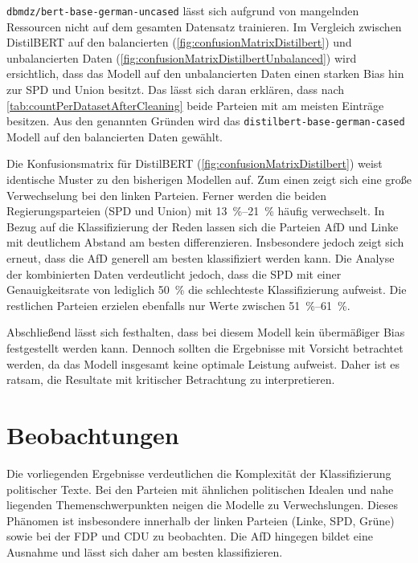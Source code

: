 \texttt{dbmdz/bert-base-german-uncased} lässt sich aufgrund von mangelnden Ressourcen nicht auf dem gesamten Datensatz trainieren. Im Vergleich zwischen DistilBERT auf den balancierten (\autoref{fig:confusionMatrixDistilbert}) und unbalancierten Daten (\autoref{fig:confusionMatrixDistilbertUnbalanced}) wird ersichtlich, dass das Modell auf den unbalancierten Daten einen starken Bias hin zur \ac{SPD} und Union besitzt. Das lässt sich daran erklären, dass nach \autoref{tab:countPerDatasetAfterCleaning} beide Parteien mit am meisten Einträge besitzen. Aus den genannten Gründen wird das \texttt{distilbert-base-german-cased} Modell auf den balancierten Daten gewählt.

Die Konfusionsmatrix für DistilBERT (\autoref{fig:confusionMatrixDistilbert}) weist identische Muster zu den bisherigen Modellen auf. Zum einen zeigt sich eine große Verwechselung bei den linken Parteien. Ferner werden die beiden Regierungsparteien (\ac{SPD} und Union) mit \SIrange{13}{21}{\percent} häufig verwechselt. In Bezug auf die Klassifizierung der Reden lassen sich die Parteien \ac{AfD} und Linke mit deutlichem Abstand am besten differenzieren. Insbesondere jedoch zeigt sich erneut, dass die \ac{AfD} generell am besten klassifiziert werden kann. Die Analyse der kombinierten Daten verdeutlicht jedoch, dass die \ac{SPD} mit einer Genauigkeitsrate von lediglich \SI{50}{\percent} die schlechteste Klassifizierung aufweist. Die restlichen Parteien erzielen ebenfalls nur Werte zwischen \SIrange{51}{61}{\percent}.

Abschließend lässt sich festhalten, dass bei diesem Modell kein übermäßiger Bias festgestellt werden kann. Dennoch sollten die Ergebnisse mit Vorsicht betrachtet werden, da das Modell insgesamt keine optimale Leistung aufweist. Daher ist es ratsam, die Resultate mit kritischer Betrachtung zu interpretieren.

\section{Beobachtungen}

Die vorliegenden Ergebnisse verdeutlichen die Komplexität der Klassifizierung politischer Texte. Bei den Parteien mit ähnlichen politischen Idealen und nahe liegenden Themenschwerpunkten neigen die Modelle zu Verwechslungen. Dieses Phänomen ist insbesondere innerhalb der linken Parteien (Linke, \ac{SPD}, Grüne) sowie bei der \ac{FDP} und \ac{CDU} zu beobachten. Die \ac{AfD} hingegen bildet eine Ausnahme und lässt sich daher am besten klassifizieren.

